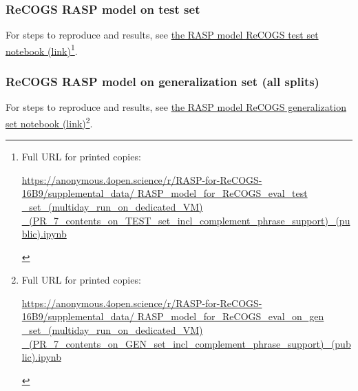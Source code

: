 \documentclass[11pt]{article}
\begin{document}
\subsubsection{ReCOGS RASP model on test set}

For steps to reproduce and results, see \href{https://anonymous.4open.science/r/RASP-for-ReCOGS-16B9/supplemental\_data/RASP\_model\_for\_ReCOGS\_eval\_test\_set\_(multiday\_run\_on\_dedicated\_VM)\_(PR\_7\_contents\_on\_TEST\_set\_incl\_complement\_phrase\_support)\_(public).ipynb}{the RASP model ReCOGS test set notebook (link)}\footnote{\begin{footnotesize}Full URL for printed copies: 

\href{https://anonymous.4open.science/r/RASP-for-ReCOGS-16B9/supplemental\_data/RASP\_model\_for\_ReCOGS\_eval\_test\_set\_(multiday\_run\_on\_dedicated\_VM)\_(PR\_7\_contents\_on\_TEST\_set\_incl\_complement\_phrase\_support)\_(public).ipynb}{https://anonymous.4open.science/r/RASP-for-ReCOGS-16B9/supplemental\_data/
RASP\_model\_for\_ReCOGS\_eval\_test
\_set\_(multiday\_run\_on\_dedicated\_VM)
\_(PR\_7\_contents\_on\_TEST\_set\_incl\_complement\_phrase\_support)\_(public).ipynb}\end{footnotesize}}.

\subsubsection{ReCOGS RASP model on generalization set (all splits)}
For steps to reproduce and results, see \href{https://anonymous.4open.science/r/RASP-for-ReCOGS-16B9/supplemental\_data/RASP\_model\_for\_ReCOGS\_eval\_on\_gen\_set\_(multiday\_run\_on\_dedicated\_VM)\_(PR\_7\_contents\_on\_GEN\_set\_incl\_complement\_phrase\_support)\_(public).ipynb}{the RASP model ReCOGS generalization set notebook (link)}\footnote{\begin{footnotesize}Full URL for printed copies: 

\href{https://anonymous.4open.science/r/RASP-for-ReCOGS-16B9/supplemental\_data/RASP\_model\_for\_ReCOGS\_eval\_on\_gen\_set\_(multiday\_run\_on\_dedicated\_VM)\_(PR\_7\_contents\_on\_GEN\_set\_incl\_complement\_phrase\_support)\_(public).ipynb}{https://anonymous.4open.science/r/RASP-for-ReCOGS-16B9/supplemental\_data/
RASP\_model\_for\_ReCOGS\_eval\_on\_gen
\_set\_(multiday\_run\_on\_dedicated\_VM)
\_(PR\_7\_contents\_on\_GEN\_set\_incl\_complement\_phrase\_support)\_(public).ipynb}\end{footnotesize}}.
\end{document}
